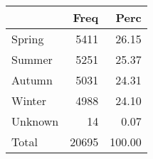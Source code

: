 
\begin{tabular}[t]{lrr}
\toprule
  & Freq & Perc\\
\midrule
Spring & 5411 & 26.15\\
Summer & 5251 & 25.37\\
Autumn & 5031 & 24.31\\
Winter & 4988 & 24.10\\
Unknown & 14 & 0.07\\
\addlinespace
Total & 20695 & 100.00\\
\bottomrule
\end{tabular}